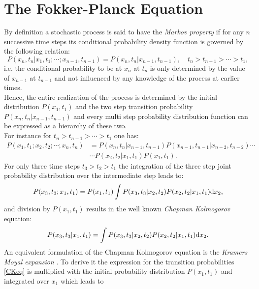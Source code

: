 \section{The Fokker-Planck Equation}
\label{The_Fokker_Planck_Equation}
By definition a stochastic process is said to have the \emph{Markov property} if for any $n$ successive time steps its conditional probability density function is governed by the following relation:
\begin{equation}
    P(x_{n},t_{n}|x_{1},t_{1};\cdots;x_{n-1},t_{n-1}) = P(x_{n},t_{n}|x_{n-1},t_{n-1}), \quad t_{n}>t_{n-1}> \cdots >t_{1},
    \label{}
\end{equation}
i.e. the conditional probability to be at $x_n$ at $t_n$ is only determined by the value of $x_{n-1}$ at $t_{n-1}$ and not influenced by any knowledge of the process at earlier times.\\
Hence, the entire realization of the process is determined by the initial distribution $P(x_1,t_1)$ and the two step transition probability $P(x_{n},t_{n}|x_{n-1},t_{n-1})$ and every multi step probability distribution function can be expressed as a hierarchy of these two. \\
For instance for $ t_n > t_{n-1} > \cdots > t_1$ one has:
\begin{align}
    P(x_1,t_1;x_2,t_2;\cdots;x_n,t_n) &= P(x_n,t_n|x_{n-1},t_{n-1})P(x_{n-1},t_{n-1}|x_{n-2},t_{n-2}) \cdots \nonumber \\
                                      & \cdots P(x_2,t_2|x_1,t_1)P(x_1,t_1).
    \label{hierarchy}
\end{align}
For only three time steps $t_3>t_2>t_1$ the integration of the three step joint probability distribution over the intermediate step leads to:
\begin{equation}
    P(x_3,t_3;x_1,t_1) = P(x_1,t_1)\int P(x_3,t_3|x_2,t_2) P(x_2,t_2|x_1,t_1) {\rm d} x_2,
\end{equation}
and division by $P(x_1,t_1)$ results in the well known \emph{Chapman Kolmogorov} equation:
\begin{equation}
    P(x_3,t_3|x_1,t_1) = \int P(x_3,t_3|x_2,t_2) P(x_2,t_2|x_1,t_1) {\rm d} x_2.
    \label{CKeq}
\end{equation}
An equivalent formulation of the Chapman Kolmogorov equation is the \emph{Kramers Moyal expansion} \cite{Kramers1940, Moyal1949}. To derive it the expression for the transition probabilities \eqref{CKeq} is multiplied with the initial probability distribution $P(x_1,t_1)$ and integrated over $x_1$ which leads to
